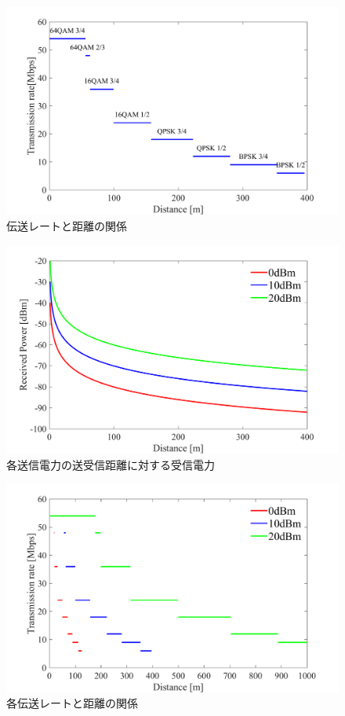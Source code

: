 \documentclass[a4paper,10.5pt]{ltjsarticle}
\begin{document}
\begin{figure}[H]
  \centering
  \includegraphics[width=\linewidth]{rate_vs_distance.pdf} %
  \caption{伝送レートと距離の関係}
  \label{fig:rate_vs_distance} %
\end{figure}

\begin{figure}[H]
  \centering
  \includegraphics[width=\linewidth]{lfsp_vs_distance_2.pdf} %
  \caption{各送信電力の送受信距離に対する受信電力}
  \label{fig:lfsp_vs_distance_2} %
\end{figure}

\begin{figure}[H]
  \centering
  \includegraphics[width=\linewidth]{rate_vs_distance_2.pdf} %
  \caption{各伝送レートと距離の関係}
  \label{fig:rate_vs_distance_2} %
\end{figure}
\end{document}
